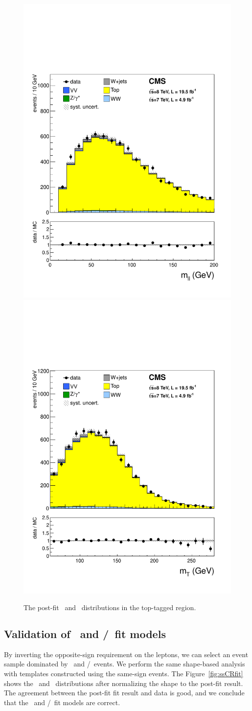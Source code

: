 \begin{figure}[!hbtp] 
\begin{center}
    \includegraphics[width=.47\textwidth]{figures/Top_mll_1j.pdf}
    \includegraphics[width=.47\textwidth]{figures/Top_mT_1j.pdf}
    \caption{The post-fit \mll\ and \mT\ distributions in the top-tagged region.} 
    \label{fig:topCRfit}
\end{center}
\end{figure}


\subsection{Validation of \Wjets\ and \wgamma/\wgammastar\ fit models}  

By inverting the opposite-sign requirement on the leptons, 
we can select an event sample dominated by \Wjets\ and \wgamma/\wgammastar\ events. 
We perform the same shape-based analysis
with templates constructed using the same-sign events.
The Figure~\ref{fig:ssCRfit} shows the \mll\ and \mT\ distributions
after normalizing the shape to the post-fit result. The agreement
between the post-fit fit result and data is good, and we conclude
that the \Wjets\ and \wgamma/\wgammastar\ fit models are correct.

